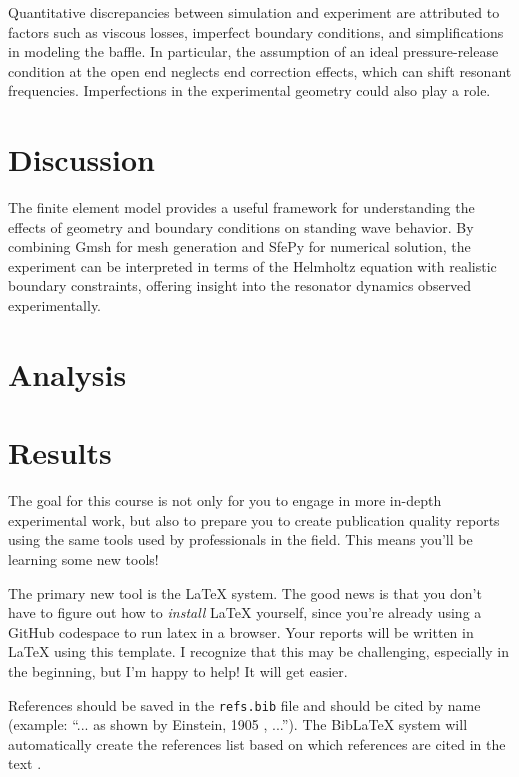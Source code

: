 \documentclass[journal, a4paper]{IEEEtran}
\begin{document}
Quantitative discrepancies between simulation and experiment are attributed to factors such as viscous losses, imperfect boundary conditions, and simplifications in modeling the baffle. In particular, the assumption of an ideal pressure-release condition at the open end neglects end correction effects, which can shift resonant frequencies. Imperfections in the experimental geometry could also play a role.

\section{Discussion}
The finite element model provides a useful framework for understanding the effects of geometry and boundary conditions on standing wave behavior. By combining Gmsh for mesh generation and SfePy for numerical solution, the experiment can be interpreted in terms of the Helmholtz equation with realistic boundary constraints, offering insight into the resonator dynamics observed experimentally.

\section{Analysis}

    
\section{Results}
	The goal for this course is not only for you to engage in more in-depth experimental work, but also to prepare you to create publication quality reports using the same tools used by professionals in the field. This means you'll be learning some new tools!

	The primary new tool is the \LaTeX{} system. The good news is that you don't have to figure out how to \textit{install} \LaTeX{} yourself, since you're already using a GitHub codespace to run latex in a browser. Your reports will be written in \LaTeX{} using this template. I recognize that this may be challenging, especially in the beginning, but I'm happy to help! It will get easier.
	

	References should be saved in the {\tt refs.bib} file and should be cited by name (example: ``... as shown by Einstein, 1905 \parencite{einstein}, ...''). The BibLaTeX system will automatically create the references list based on which references are cited in the text \parencite{dirac}.
\end{document}
